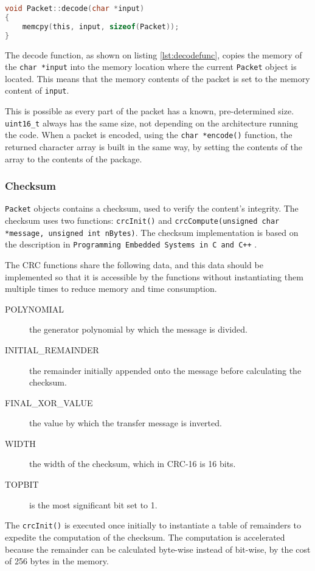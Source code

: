 \begin{lstlisting}[language=C,label={lst:decodefunc},caption={Decode function.}]
void Packet::decode(char *input)
{
    memcpy(this, input, sizeof(Packet));
}
\end{lstlisting}
The decode function, as shown on listing \ref{lst:decodefunc}, copies the memory of the \texttt{char *input} into the memory location where the current \texttt{Packet} object is located. This means that the memory contents of the packet is set to the memory content of \texttt{input}.

This is possible as every part of the packet has a known, pre-determined size. \texttt{uint16\_t} always has the same size, not depending on the architecture running the code. When a packet is encoded, using the \texttt{char *encode()} function, the returned character array is built in the same way, by setting the contents of the array to the contents of the package.

\subsubsection{Checksum}
\texttt{Packet} objects contains a checksum, used to verify the content's integrity. The checksum uses two functions: \texttt{crcInit()} and \texttt{crcCompute(unsigned char *message, unsigned int nBytes)}. The checksum implementation is based on the description in \texttt{Programming Embedded Systems in C and C++} \cite{crcCode}.

The CRC functions share the following data, and this data should be implemented so that it is accessible by the functions without instantiating them multiple times to reduce memory and time consumption.

\begin{description}
	\item[POLYNOMIAL] the generator polynomial by which the message is divided.
	\item[INITIAL\_REMAINDER] the remainder initially appended onto the message before calculating the checksum.
	\item[FINAL\_XOR\_VALUE] the value by which the transfer message is inverted.
	\item[WIDTH] the width of the checksum, which in CRC-16 is 16 bits.
	\item[TOPBIT] is the most significant bit set to 1.
\end{description}

The \texttt{crcInit()} is executed once initially to instantiate a table of remainders to expedite the computation of the checksum. The computation is accelerated because the remainder can be calculated byte-wise instead of bit-wise, by the cost of 256 bytes in the memory.  


